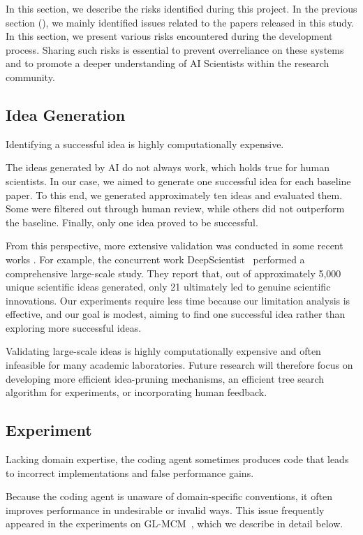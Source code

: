 \label{sec:risk}
In this section, we describe the risks identified during this project.
In the previous section (), we mainly identified issues related to the papers released in this study. In this section, we present various risks encountered during the development process.
Sharing such risks is essential to prevent overreliance on these systems and to promote a deeper understanding of AI Scientists within the research community.



\subsection{Idea Generation}
\begin{tcolorbox}[colback=gray!10, colframe=gray!40!black, title=Idea Risk1:,breakable]
     Identifying a successful idea is highly computationally expensive.
\end{tcolorbox}
The ideas generated by AI do not always work, which holds true for human scientists.
In our case, we aimed to generate one successful idea for each baseline paper.
To this end, we generated approximately ten ideas and evaluated them. Some were filtered out through human review, while others did not outperform the baseline. Finally, only one idea proved to be successful.

From this perspective, more extensive validation was conducted in some recent works \citep{liu2025alphago, weng2025deepscientist}.
For example, the concurrent work DeepScientist~\citep{weng2025deepscientist} performed a comprehensive large-scale study.
They report that, out of approximately 5,000 unique scientific ideas generated, only 21 ultimately led to genuine scientific innovations. Our experiments require less time because our limitation analysis is effective, and our goal is modest, aiming to find one successful idea rather than exploring more successful ideas.

Validating large-scale ideas is highly computationally expensive and often infeasible for many academic laboratories.
Future research will therefore focus on developing more efficient idea-pruning mechanisms, an efficient tree search algorithm for experiments, or incorporating human feedback.

\subsection{Experiment}
\begin{tcolorbox}[colback=gray!10, colframe=gray!40!black, title=Experiment Risk1 :,breakable]
     Lacking domain expertise, the coding agent sometimes produces code that leads to incorrect implementations and false performance gains.
\end{tcolorbox}
Because the coding agent is unaware of domain-specific conventions, it often improves performance in undesirable or invalid ways.
This issue frequently appeared in the experiments on GL-MCM~\citep{miyai2025gl}, which we describe in detail below.

